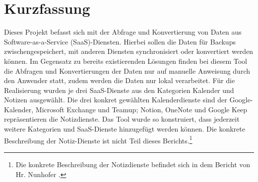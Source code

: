 \section{Kurzfassung}
Dieses Projekt befasst sich mit der Abfrage und Konvertierung von Daten aus Software-as-a-Service (SaaS)-Diensten. Hierbei sollen die Daten für Backups zwischengespeichert, mit anderen Diensten synchronisiert oder konvertiert werden können. Im Gegensatz zu bereits existierenden Lösungen finden bei diesem Tool die Abfragen und Konvertierungen der Daten nur auf manuelle Anweisung durch den Anwender statt, zudem werden die Daten nur lokal verarbeitet.
Für die Realisierung wurden je drei SaaS-Dienste aus den Kategorien \glqq Kalender\grqq{} und \glqq Notizen\grqq{} ausgewählt. Die drei konkret gewählten Kalenderdienste sind der Google-Kalender, Microsoft Exchange und Teamup; Notion, OneNote und Google Keep repräsentieren die Notizdienste. Das Tool wurde so konstruiert, dass jederzeit weitere Kategorien und SaaS-Dienste hinzugefügt werden können. Die konkrete Beschreibung der Notiz-Dienste ist nicht Teil dieses Berichts.\footnote{Die konkrete Beschreibung der Notizdienste befindet sich in dem Bericht von Hr. Nunhofer \cite{Nunhofer2020}.}
